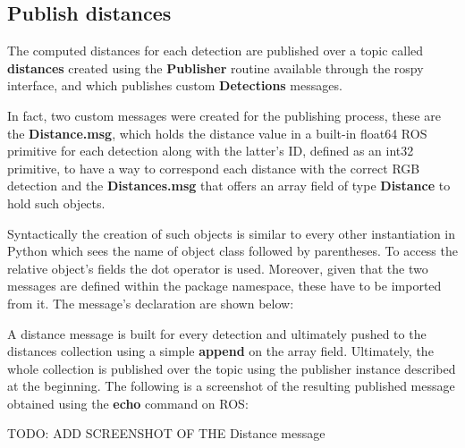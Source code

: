 \subsection{Publish distances}

The computed distances for each detection are published over a topic called \textbf{distances} created using the \textbf{Publisher} routine available through the rospy interface, and which publishes custom \textbf{Detections} messages. 

In fact, two custom messages were created for the publishing process, these are the \textbf{Distance.msg}, which holds the distance value in a built-in float64 ROS primitive for each detection along with the latter's ID, defined as an int32 primitive, to have a way to correspond each distance with the correct RGB detection and the \textbf{Distances.msg} that offers an array field of type \textbf{Distance} to hold such objects.

Syntactically the creation of such objects is similar to every other instantiation in Python which sees the name of object class followed by parentheses. To access the relative object's fields the dot operator is used. Moreover, given that the two messages are defined within the package namespace, these have to be imported from it. The message's declaration are shown below:

    

A distance message is built for every detection and ultimately pushed to the distances collection using a simple \textbf{append} on the array field. Ultimately, the whole collection is published over the topic using the publisher instance described at the beginning. The following is a screenshot of the resulting published message obtained using the \textbf{echo} command on ROS:

TODO: ADD SCREENSHOT OF THE Distance message
\clearpage

